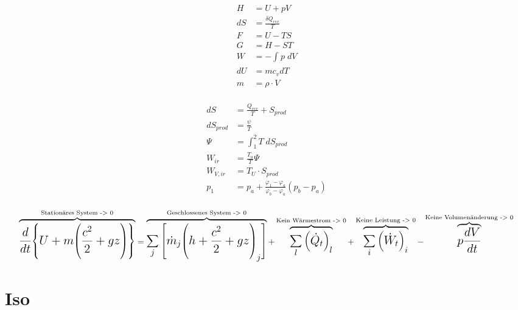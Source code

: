 \documentclass[twocolumn]{article}
\begin{document}
\begin{multicols}{2}
\begin{align*}
	H 	&=	U + pV 				\\ 	
       	dS 	&=	\frac{\delta Q_{rev}}{T}	\\
	F 	&=	U-TS 				\\
	G 	&=	H-ST	\\
	W 	&=	-\int_{}^{} p\; dV		\\
	dU	&= 	mc_vdT 				\\
	m	&=  	\rho \cdot V	 				\\
	\end{align*}

	\begin{align*}
       	dS 		&=  	\frac{Q_{rev}}{T} + S_{prod}	\\
	dS_{prod}	&=	\frac{\psi}{T} 			\\
	\Psi 		&= 	\int_{1}^{2} T\; dS_{prod}	\\
	W_{ir}		&=	\frac{T_u}{T}\Psi		\\
		W_{V,ir}		&=	T_U \cdot S_{prod}		\\
	p_1 		&= p_a  + \frac{\varphi_1 - \varphi_a}{\varphi_b- \varphi_a}(p_b - p_a) \\
\end{align*}
\end{multicols}

\begin{equation*}
\Large
	\overbrace{
	\frac{d}{dt}\Bigg{\{} U 
	+
	m \Bigg{(}\frac{c^2}{2}+gz\Bigg{)}\Bigg{\}}}
	^{\text{Stationäres System -> 0}} 
	=
	\overbrace{
	\sum_{j}{\Bigg{[}\dot{m}_j\Bigg{(}h+\frac{c^2}{2}+gz\Bigg{)}_j \Bigg{]}}}
	^{\text{Geschlossenes System -> 0}}  
	+
	\overbrace{
	\sum_{l}^{} \Big(\dot{Q}_t\Big)_l}
	^{\text{Kein Wärmestrom -> 0}} 
	+
	\overbrace{
	\sum_{i}\Big(\dot{W}_t\Big)_i}
	^{\text{Keine Leistung -> 0}}
	-
	\overbrace{
	p\frac{dV}{dt}}
	^{\text{Keine Volumenänderung -> 0}}
\end{equation*}

%                 
\section{Iso}
\end{document}
